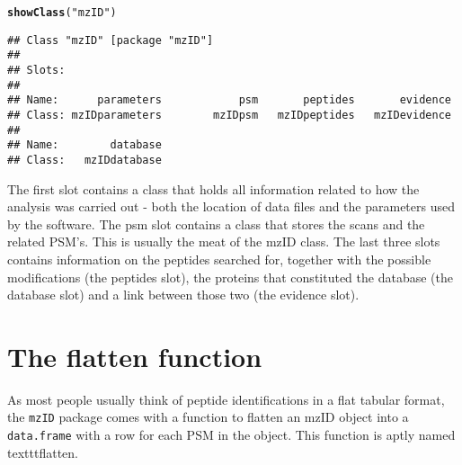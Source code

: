 \documentclass[a4paper]{article}\usepackage{graphicx, color}
\makeatletter
\newcommand{\hlfunctioncall}[1]{\textcolor[rgb]{0.501960784313725,0,0.329411764705882}{\textbf{#1}}}%
\newcommand{\hlstring}[1]{\textcolor[rgb]{0.6,0.6,1}{#1}}%
\newenvironment{kframe}{%
 \def\at@end@of@kframe{}%
 \ifinner\ifhmode%
  \def\at@end@of@kframe{\end{minipage}}%
  \begin{minipage}{\columnwidth}%
 \fi\fi%
 \def\FrameCommand##1{\hskip\@totalleftmargin \hskip-\fboxsep
 \colorbox{shadecolor}{##1}\hskip-\fboxsep
     \hskip-\linewidth \hskip-\@totalleftmargin \hskip\columnwidth}%
 \MakeFramed {\advance\hsize-\width
   \@totalleftmargin\z@ \linewidth\hsize
   \@setminipage}}%
 {\par\unskip\endMakeFramed%
 \at@end@of@kframe}
\newenvironment{knitrout}{}{} %
\makeatother
\begin{document}
\begin{knitrout}
\color{fgcolor}\begin{kframe}
\begin{alltt}
\hlfunctioncall{showClass}(\hlstring{"mzID"})
\end{alltt}
\begin{verbatim}
## Class "mzID" [package "mzID"]
## 
## Slots:
##                                                                   
## Name:      parameters            psm       peptides       evidence
## Class: mzIDparameters        mzIDpsm   mzIDpeptides   mzIDevidence
##                      
## Name:        database
## Class:   mzIDdatabase
\end{verbatim}
\end{kframe}
\end{knitrout}

The first slot contains a class that holds all information related to how the analysis was carried out - both the location of data files and the parameters used by the software. The psm slot contains a class that stores the scans and the related PSM's. This is usually the meat of the mzID class. The last three slots contains information on the peptides searched for, together with the possible modifications (the peptides slot), the proteins that constituted the database (the database slot) and a link between those two (the evidence slot).

\section*{The flatten function}
As most people usually think of peptide identifications in a flat tabular format, the \texttt{mzID} package comes with a function to flatten an mzID object into a \texttt{data.frame} with a row for each PSM in the object. This function is aptly named texttt{flatten}.
\end{document}
